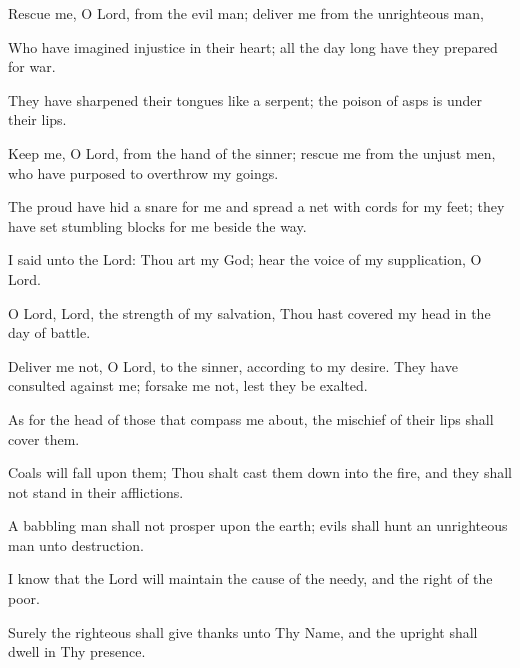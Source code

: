 Rescue me, O Lord, from the evil man; deliver me from the unrighteous man,

Who have imagined injustice in their heart; all the day long have they prepared for war.

They have sharpened their tongues like a serpent; the poison of asps is under their lips.

Keep me, O Lord, from the hand of the sinner; rescue me from the unjust men, who have purposed to overthrow my goings.

The proud have hid a snare for me and spread a net with cords for my feet; they have set stumbling blocks for me beside the way.

I said unto the Lord: Thou art my God; hear the voice of my supplication, O Lord.

O Lord, Lord, the strength of my salvation, Thou hast covered my head in the day of battle.

Deliver me not, O Lord, to the sinner, according to my desire. They have consulted against me; forsake me not, lest they be exalted.

As for the head of those that compass me about, the mischief of their lips shall cover them.

Coals will fall upon them; Thou shalt cast them down into the fire, and they shall not stand in their afflictions.

A babbling man shall not prosper upon the earth; evils shall hunt an unrighteous man unto destruction.

I know that the Lord will maintain the cause of the needy, and the right of the poor.

Surely the righteous shall give thanks unto Thy Name, and the upright shall dwell in Thy presence.
